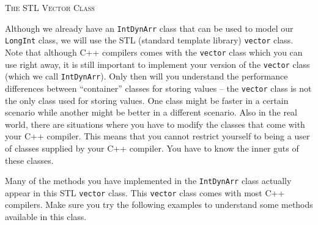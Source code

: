 \textsc{The STL Vector Class}

Although we already have an \verb!IntDynArr! class that can be used 
to model our \verb!LongInt! class, we will use the STL (standard 
template library) \verb!vector! class. Note that although C++ 
compilers comes with the \verb!vector! class which you can use right 
away, it is still important to implement your version of the 
\verb!vector! class (which we call \verb!IntDynArr!). Only then will 
you understand the performance differences between “container” classes  
for storing values -- the \verb!vector! class is not the only class used 
for storing values. One class might be faster in a certain scenario while 
another might be better in a different scenario. Also in the real world, 
there are situations where you have to modify the classes that come with 
your C++ compiler. This means that you cannot restrict yourself to being 
a user of classes supplied by your C++ compiler. You have to know the 
inner guts of these classes.

Many of the methods you have implemented in the \verb!IntDynArr! class 
actually appear in this STL \verb!vector! class. This \verb!vector! class 
comes with most C++ compilers. Make sure you try the following examples 
to understand some methods available in this class.

